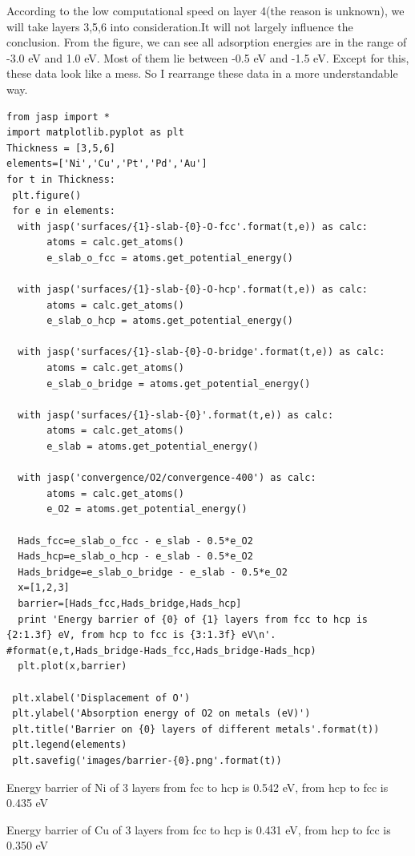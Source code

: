 \documentclass[11pt]{article}
\begin{document}
According to the low computational speed on layer 4(the reason is unknown), we will take layers 3,5,6 into consideration.It will not largely influence the conclusion. From the figure, we can see all adsorption energies are in the range of -3.0 eV and 1.0 eV. Most of them lie between -0.5 eV and -1.5 eV. Except for this, these data look like a mess. So I rearrange these data in a more understandable way.


\begin{verbatim}
from jasp import *
import matplotlib.pyplot as plt
Thickness = [3,5,6]
elements=['Ni','Cu','Pt','Pd','Au']
for t in Thickness:
 plt.figure()
 for e in elements:
  with jasp('surfaces/{1}-slab-{0}-O-fcc'.format(t,e)) as calc:
       atoms = calc.get_atoms()
       e_slab_o_fcc = atoms.get_potential_energy()

  with jasp('surfaces/{1}-slab-{0}-O-hcp'.format(t,e)) as calc:
       atoms = calc.get_atoms()
       e_slab_o_hcp = atoms.get_potential_energy()

  with jasp('surfaces/{1}-slab-{0}-O-bridge'.format(t,e)) as calc:
       atoms = calc.get_atoms()
       e_slab_o_bridge = atoms.get_potential_energy()

  with jasp('surfaces/{1}-slab-{0}'.format(t,e)) as calc:
       atoms = calc.get_atoms()
       e_slab = atoms.get_potential_energy()

  with jasp('convergence/O2/convergence-400') as calc:
       atoms = calc.get_atoms()
       e_O2 = atoms.get_potential_energy()

  Hads_fcc=e_slab_o_fcc - e_slab - 0.5*e_O2
  Hads_hcp=e_slab_o_hcp - e_slab - 0.5*e_O2
  Hads_bridge=e_slab_o_bridge - e_slab - 0.5*e_O2
  x=[1,2,3]
  barrier=[Hads_fcc,Hads_bridge,Hads_hcp]
  print 'Energy barrier of {0} of {1} layers from fcc to hcp is {2:1.3f} eV, from hcp to fcc is {3:1.3f} eV\n'.
#format(e,t,Hads_bridge-Hads_fcc,Hads_bridge-Hads_hcp)
  plt.plot(x,barrier)

 plt.xlabel('Displacement of O')
 plt.ylabel('Absorption energy of O2 on metals (eV)')
 plt.title('Barrier on {0} layers of different metals'.format(t))
 plt.legend(elements)
 plt.savefig('images/barrier-{0}.png'.format(t))
\end{verbatim}

Energy barrier of Ni of 3 layers from fcc to hcp is 0.542 eV, from hcp to fcc is 0.435 eV

Energy barrier of Cu of 3 layers from fcc to hcp is 0.431 eV, from hcp to fcc is 0.350 eV
\end{document}
